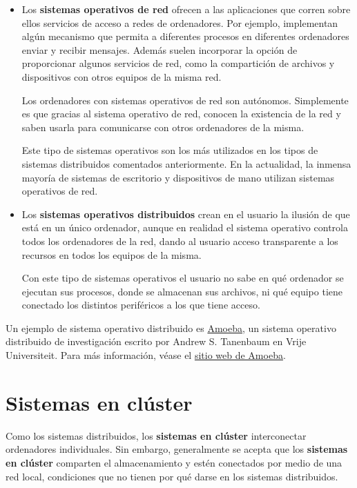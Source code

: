 \begin{itemize}
\item
  Los \textbf{sistemas operativos de red} {} ofrecen a las aplicaciones
  que corren sobre ellos servicios de acceso a redes de ordenadores. Por
  ejemplo, implementan algún mecanismo que permita a diferentes procesos
  en diferentes ordenadores enviar y recibir mensajes. Además suelen
  incorporar la opción de proporcionar algunos servicios de red, como la
  compartición de archivos y dispositivos con otros equipos de la misma
  red.

  Los ordenadores con sistemas operativos de red son autónomos.
  Simplemente es que gracias al sistema operativo de red, conocen la
  existencia de la red y saben usarla para comunicarse con otros
  ordenadores de la misma.

  Este tipo de sistemas operativos son los más utilizados en los tipos
  de sistemas distribuidos comentados anteriormente. En la actualidad,
  la inmensa mayoría de sistemas de escritorio y dispositivos de mano
  utilizan sistemas operativos de red.
\item
  Los \textbf{sistemas operativos distribuidos} {} crean en el usuario
  la ilusión de que está en un único ordenador, aunque en realidad el
  sistema operativo controla todos los ordenadores de la red, dando al
  usuario acceso transparente a los recursos en todos los equipos de la
  misma.

  Con este tipo de sistemas operativos el usuario no sabe en qué
  ordenador se ejecutan sus procesos, donde se almacenan sus archivos,
  ni qué equipo tiene conectado los distintos periféricos a los que
  tiene acceso.
\end{itemize}

Un ejemplo de sistema operativo distribuido es
\href{https://en.wikipedia.org/wiki/Amoeba_(operating_system)}{Amoeba},
un sistema operativo distribuido de investigación escrito por Andrew S.
Tanenbaum en Vrije Universiteit. Para más información, véase el
\href{http://www.cs.vu.nl/pub/amoeba/}{sitio web de Amoeba}.

\section{Sistemas en clúster}\label{_sistemas_en_cluxfaster}

{} Como los sistemas distribuidos, los \textbf{sistemas en clúster}
interconectar ordenadores individuales. Sin embargo, generalmente se
acepta que los \textbf{sistemas en clúster} comparten el almacenamiento
y estén conectados por medio de una red local, condiciones que no tienen
por qué darse en los sistemas distribuidos.

